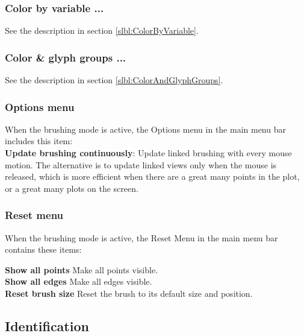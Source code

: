 \documentclass[11pt]{article}
\begin{document}
\subsubsection{Color by variable ...}

See the description in section \ref{slbl:ColorByVariable}.

\subsubsection{Color \& glyph groups ...}

See the description in section \ref{slbl:ColorAndGlyphGroups}.

\subsubsection{Options menu}
%
When the brushing mode is active, the Options menu in the main
menu bar includes this item:
\medskip
\noindent
\\{\bf Update brushing continuously}: Update linked
  brushing with every mouse motion.  The alternative is to update linked
  views only when the mouse is released, which is more efficient when
  there are a great many points in the plot, or a great many plots on
  the screen.

\subsubsection{Reset menu}
%
When the brushing mode is active, the Reset Menu in the main
menu bar contains these items:

\begin{tabbing}
 {\bf Show all points} \hspace{.5in} \= Make all points visible. \\
 {\bf Show all edges} \> Make all edges visible. \\
 {\bf Reset brush size} \> Reset the brush to its default size and position. \\
\end{tabbing}
%

\subsection{Identification}
\label{slbl:Identify}
\end{document}
